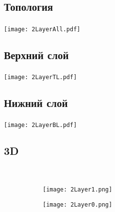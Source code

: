 \documentclass[c]{beamer}  %
\begin{document}
\subsection{Топология}
	
	\begin{frame}
		\frametitle{\insertsection}
		\framesubtitle{\insertsubsection}
		\centering
		\texttt{[image: 2LayerAll.pdf]}	
		
	\end{frame}

\subsection{Верхний слой}
	
	\begin{frame}
		\frametitle{\insertsection}
		\framesubtitle{\insertsubsection}
		\centering
		\texttt{[image: 2LayerTL.pdf]}	
		
		
	\end{frame}

\subsection{Нижний слой}
	
	\begin{frame}
		\frametitle{\insertsection}
		\framesubtitle{\insertsubsection}
		\centering
		\texttt{[image: 2LayerBL.pdf]}	
		
		
	\end{frame}

\subsection{3D}

	\begin{frame}
		\frametitle{\insertsection}
		\framesubtitle{\insertsubsection}
		\begin{figure}
			\centering\
			\begin{subfigure}{0.5\textwidth}
				\centering
				\texttt{[image: 2Layer1.png]}
			\end{subfigure}%
			\begin{subfigure}{0.5\textwidth}
				\centering
				\texttt{[image: 2Layer0.png]}
			\end{subfigure}
		\end{figure}
	\end{frame}
\end{document}
